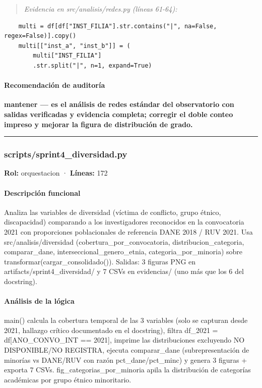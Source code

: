 \begin{tcolorbox}[riesgo]
\begin{itemize}
\begin{quote}\footnotesize\ttfamily
\noindent\emph{Evidencia en src/analisis/redes.py (líneas 61-64):}
\end{quote}
\begin{lstlisting}
    multi = df[df["INST_FILIA"].str.contains("|", na=False, regex=False)].copy()
    multi[["inst_a", "inst_b"]] = (
        multi["INST_FILIA"]
        .str.split("|", n=1, expand=True)
\end{lstlisting}

\end{itemize}
\end{tcolorbox}

\paragraph{Recomendación de auditoría}
\textbf{mantener --- es el análisis de redes estándar del observatorio con salidas verificadas y evidencia completa; corregir el doble conteo impreso y mejorar la figura de distribución de grado.}

\medskip
\hrule

\subsubsection{scripts/sprint4\_diversidad.py}
\textbf{Rol:} orquestacion · \textbf{Líneas:} 172

\paragraph{Descripción funcional}
Analiza las variables de diversidad (víctima de conflicto, grupo étnico, discapacidad) comparando a los investigadores reconocidos en la convocatoria 2021 con proporciones poblacionales de referencia DANE 2018 / RUV 2021. Usa src/analisis/diversidad (cobertura\_por\_convocatoria, distribucion\_categoria, comparar\_dane, interseccional\_genero\_etnia, categoria\_por\_minoria) sobre transformar(cargar\_consolidado()). Salidas: 3 figuras PNG en artifacts/sprint4\_diversidad/ y 7 CSVs en evidencias/ (uno más que los 6 del docstring).

\paragraph{Análisis de la lógica}
main() calcula la cobertura temporal de las 3 variables (solo se capturan desde 2021, hallazgo crítico documentado en el docstring), filtra df\_2021 = df[ANO\_CONVO\_INT == 2021], imprime las distribuciones excluyendo NO DISPONIBLE/NO REGISTRA, ejecuta comparar\_dane (subrepresentación de minorías vs DANE/RUV con razón pct\_dane/pct\_minc) y genera 3 figuras + exporta 7 CSVs. fig\_categorias\_por\_minoria apila la distribución de categorías académicas por grupo étnico minoritario.

